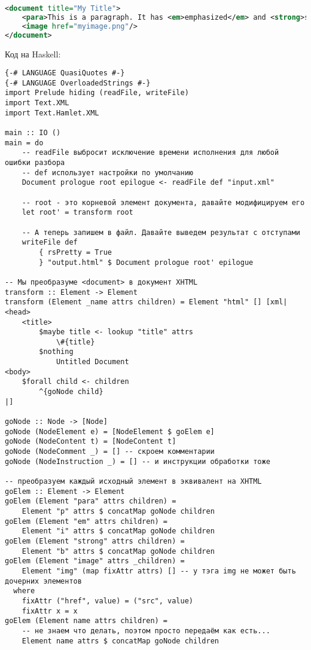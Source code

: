 \begin{lstlisting}[language=XML]
<document title="My Title">
    <para>This is a paragraph. It has <em>emphasized</em> and <strong>strong</strong> words.</para>
    <image href="myimage.png"/>
</document>
\end{lstlisting}

Код на Haskell:

\begin{lstlisting}
{-# LANGUAGE QuasiQuotes #-}
{-# LANGUAGE OverloadedStrings #-}
import Prelude hiding (readFile, writeFile)
import Text.XML
import Text.Hamlet.XML

main :: IO ()
main = do
    -- readFile выбросит исключение времени исполнения для любой ошибки разбора
    -- def использует настройки по умолчанию
    Document prologue root epilogue <- readFile def "input.xml"

    -- root - это корневой элемент документа, давайте модифицируем его
    let root' = transform root

    -- А теперь запишем в файл. Давайте выведем результат с отступами
    writeFile def
        { rsPretty = True
        } "output.html" $ Document prologue root' epilogue

-- Мы преобразуме <document> в документ XHTML
transform :: Element -> Element
transform (Element _name attrs children) = Element "html" [] [xml|
<head>
    <title>
        $maybe title <- lookup "title" attrs
            \#{title}
        $nothing
            Untitled Document
<body>
    $forall child <- children
        ^{goNode child}
|]

goNode :: Node -> [Node]
goNode (NodeElement e) = [NodeElement $ goElem e]
goNode (NodeContent t) = [NodeContent t]
goNode (NodeComment _) = [] -- скроем комментарии
goNode (NodeInstruction _) = [] -- и инструкции обработки тоже

-- преобразуем каждый исходный элемент в эквивалент на XHTML
goElem :: Element -> Element
goElem (Element "para" attrs children) =
    Element "p" attrs $ concatMap goNode children
goElem (Element "em" attrs children) =
    Element "i" attrs $ concatMap goNode children
goElem (Element "strong" attrs children) =
    Element "b" attrs $ concatMap goNode children
goElem (Element "image" attrs _children) =
    Element "img" (map fixAttr attrs) [] -- у тэга img не может быть дочерних элементов
  where
    fixAttr ("href", value) = ("src", value)
    fixAttr x = x
goElem (Element name attrs children) =
    -- не знаем что делать, поэтом просто передаём как есть...
    Element name attrs $ concatMap goNode children
\end{lstlisting}%

